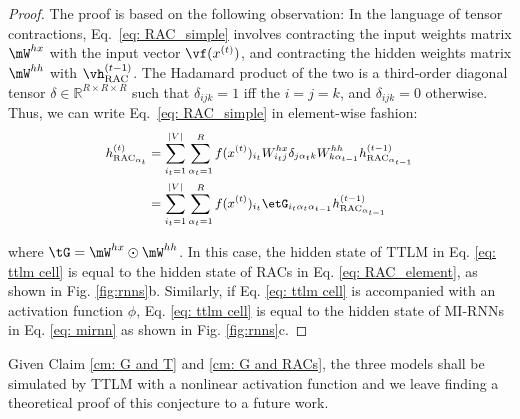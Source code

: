\documentclass{article}
\theoremstyle{plain}
\theoremstyle{definition}
\theoremstyle{remark}
\begin{document}
\begin{proof} The proof is based on the following observation:
%
In the language of tensor contractions, Eq.\ \ref{eq: RAC_simple} involves contracting the input weights matrix  $\mW^{hx}$ with the input vector $\vf (x^{(t)})$, and contracting the hidden weights matrix $\mW^{hh}$ with $\vh^{(t-1)}_\textrm{RAC}$. The Hadamard product of the two is a third-order diagonal tensor $\delta \in \mathbb{R}^{R \times R \times R}$ such that $\delta_{ijk} = 1$ if{f} the $i = j = k$, and $\delta_{ijk} = 0$ otherwise. Thus, we can write Eq.\ \ref{eq: RAC_simple} in element-wise fashion: 
%
\begin{equation} \small
\begin{split}
    \label{eq: RAC_element}
    h^{(t)}_{\textrm{RAC}_{\alpha_t}}
    & = \sum_{{i_t = 1}}^{|V|} \sum_{{\alpha_t = 1}}^{R} f(x^{(t)})_{i_t}W^{hx}_{i_tj}\mathbf{\delta}_{j\alpha_{t}k}W^{hh}_{k\alpha_{t-1}} h^{(t-1)}_{\textrm{RAC}_{\alpha_{t-1}}} \\
    & = \sum_{{i_t = 1}}^{|V|} \sum_{{\alpha_t = 1}}^{R} f(x^{(t)})_{i_t}\etG_{i_t\alpha_{t}\alpha_{t-1}} h^{(t-1)}_{\textrm{RAC}_{\alpha_{t-1}}} \\
\end{split}
\end{equation}


where $\tG = \mW^{hx} \odot \mW^{hh}$. In this case, the hidden state of TTLM in Eq. \ref{eq: ttlm cell} is equal to the hidden state of RACs in Eq. \ref{eq: RAC_element},  as shown in Fig. \ref{fig:rnns}b.  Similarly,  if Eq. \ref{eq: ttlm cell} is accompanied with an activation function $\phi$,  Eq. \ref{eq: ttlm cell}  is equal to the hidden state of MI-RNNs in Eq. \ref{eq: mirnn} as shown in Fig. \ref{fig:rnns}c. 

\end{proof}

Given Claim \ref{cm: G and T} and \ref{cm: G and RACs}, the three models shall be simulated by TTLM with a nonlinear activation function and we leave finding a theoretical proof of this conjecture to a future work.

\end{document}
